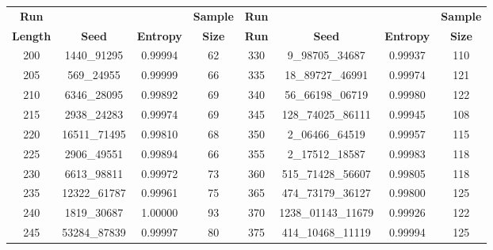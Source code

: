 \documentclass[preprint]{sigplanconf}
\begin{document}
\begin{table}
    \begin{center}
        \begin{tabular}{|c c c c| c c c c|}
            \hline
            \textbf{Run}    &                  &                  & \textbf{Sample} & \textbf{Run} &                     &                  & \textbf{Sample} \\
            \textbf{Length} & \textbf{Seed}    & \textbf{Entropy} & \textbf{Size}   & \textbf{Run} & \textbf{Seed}       & \textbf{Entropy} & \textbf{Size}   \\
            \hline
            200             & 1440\_91295      & 0.99994          & 62              & 330          & 9\_98705\_34687     & 0.99937          & 110             \\
            205             & 569\_24955       & 0.99999          & 66              & 335          & 18\_89727\_46991    & 0.99974          & 121             \\
            210             & 6346\_28095      & 0.99892          & 69              & 340          & 56\_66198\_06719    & 0.99980          & 122             \\
            215             & 2938\_24283      & 0.99974          & 69              & 345          & 128\_74025\_86111   & 0.99945          & 108             \\
            220             & 16511\_71495     & 0.99810          & 68              & 350          & 2\_06466\_64519     & 0.99957          & 115             \\
            225             & 2906\_49551      & 0.99894          & 66              & 355          & 2\_17512\_18587     & 0.99983          & 118             \\
            230             & 6613\_98811      & 0.99972          & 73              & 360          & 515\_71428\_56607   & 0.99805          & 118             \\
            235             & 12322\_61787     & 0.99961          & 75              & 365          & 474\_73179\_36127   & 0.99800          & 125             \\
            240             & 1819\_30687      & 1.00000          & 93              & 370          & 1238\_01143\_11679  & 0.99926          & 122             \\
            245             & 53284\_87839     & 0.99997          & 80              & 375          & 414\_10468\_11119   & 0.99994          & 125             \\

\end{tabular}
\end{center}
\end{table}
\end{document}

